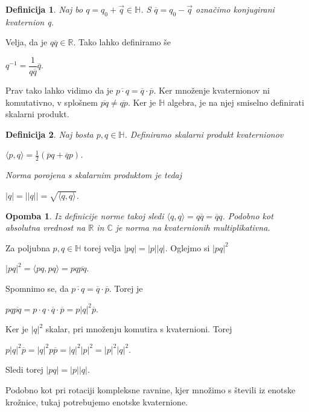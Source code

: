 \documentclass[a4paper,12pt]{article}
\def\R{\mathbb{R}} %
\def\C{\mathbb{C}} %
\def\H{\mathbb{H}} %
\newtheorem{opomba}{Opomba}
\newtheorem{definicija}{Definicija}
\begin{document}

\begin{definicija}
Naj bo $q = q_{0} + \vec{q}\in \H$. S $\overline{q} = q_{0} -\vec{q}$ označimo \emph{konjugirani kvaternion} q.
\end{definicija}
Velja, da je $q\overline{q} \in \R$. Tako lahko definiramo še 
\begin{center}
   $q^{-1} = \dfrac{1}{q\overline{q}} \overline{q}$.
\end{center}
Prav tako lahko vidimo da je $\overline{p \cdot q} = \overline{q} \cdot \overline{p}$. Ker množenje kvaternionov ni komutativno,
v splošnem $\overline{pq} \neq \overline{qp}$. Ker je $\H$ algebra, je na njej smiselno definirati skalarni produkt.

\begin{definicija}
Naj bosta $p,q \in \H$. Definiramo skalarni produkt kvaternionov
\begin{center}
   $\langle p,q \rangle = \frac{1}{2} (\overline{p}q + \overline{q}p)$.
\end{center}
Norma porojena s skalarnim produktom je tedaj
\begin{center}
   $|q| = ||q|| = \sqrt{\langle q, q\rangle}$.
\end{center}
\end{definicija}

\begin{opomba}
Iz definicije norme takoj sledi $\langle q, q\rangle = q\overline{q} = \overline{q}q$.
Podobno kot absolutna vrednost na $\R$ in $\C$ je norma na kvaternionih multiplikativna.
\end{opomba}
Za poljubna $p,q \in \H$ torej velja $|pq| = |p||q|$. Oglejmo si $|pq|^2$
\begin{center}
   $|pq|^2 = \langle pq, pq \rangle = pq\overline{pq}$.
\end{center}
Spomnimo se, da $\overline{p \cdot q} = \overline{q} \cdot \overline{p}$. Torej je
\begin{center}
   $pq\overline{pq} = p\cdot q\cdot \overline{q} \cdot \overline{p} = p |q|^2 \overline{p}$.
\end{center}
Ker je $|q|^2$ skalar, pri množenju komutira s kvaternioni. Torej
\begin{center}
   $p|q|^2\overline{p} = |q|^2p\overline{p} = |q|^2 |p|^2 = |p|^2 |q|^2$.
\end{center}
Sledi torej $|pq| = |p||q|$.

Podobno kot pri rotaciji kompleksne ravnine, kjer množimo s števili iz enotske krožnice, tukaj potrebujemo 
enotske kvaternione.
\end{document}
